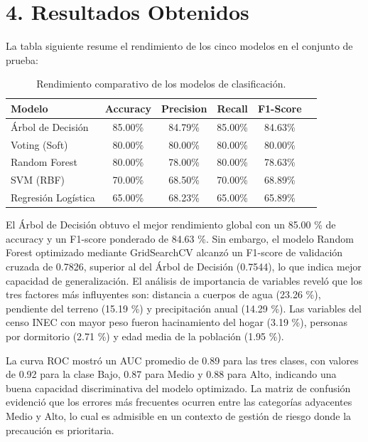 \documentclass[12pt,a4paper]{article}
\begin{document}
\section{4. Resultados Obtenidos}

La tabla siguiente resume el rendimiento de los cinco modelos en el conjunto de prueba:

\begin{table}[h!]
\centering
\begin{tabular}{lccccc}
\toprule
\textbf{Modelo} & \textbf{Accuracy} & \textbf{Precision} & \textbf{Recall} & \textbf{F1-Score} \\
\midrule
Árbol de Decisión   & 85.00\% & 84.79\% & 85.00\% & 84.63\% \\
Voting (Soft)       & 80.00\% & 80.00\% & 80.00\% & 80.00\% \\
Random Forest       & 80.00\% & 78.00\% & 80.00\% & 78.63\% \\
SVM (RBF)           & 70.00\% & 68.50\% & 70.00\% & 68.89\% \\
Regresión Logística & 65.00\% & 68.23\% & 65.00\% & 65.89\% \\
\bottomrule
\end{tabular}
\caption{Rendimiento comparativo de los modelos de clasificación.}
\end{table}

El Árbol de Decisión obtuvo el mejor rendimiento global con un 85.00 \% de accuracy y un F1-score ponderado de 84.63 \%. Sin embargo, el modelo Random Forest optimizado mediante GridSearchCV alcanzó un F1-score de validación cruzada de 0.7826, superior al del Árbol de Decisión (0.7544), lo que indica mejor capacidad de generalización. El análisis de importancia de variables reveló que los tres factores más influyentes son: distancia a cuerpos de agua (23.26 \%), pendiente del terreno (15.19 \%) y precipitación anual (14.29 \%). Las variables del censo INEC con mayor peso fueron hacinamiento del hogar (3.19 \%), personas por dormitorio (2.71 \%) y edad media de la población (1.95 \%).

La curva ROC mostró un AUC promedio de 0.89 para las tres clases, con valores de 0.92 para la clase Bajo, 0.87 para Medio y 0.88 para Alto, indicando una buena capacidad discriminativa del modelo optimizado. La matriz de confusión evidenció que los errores más frecuentes ocurren entre las categorías adyacentes Medio y Alto, lo cual es admisible en un contexto de gestión de riesgo donde la precaución es prioritaria.
\end{document}
